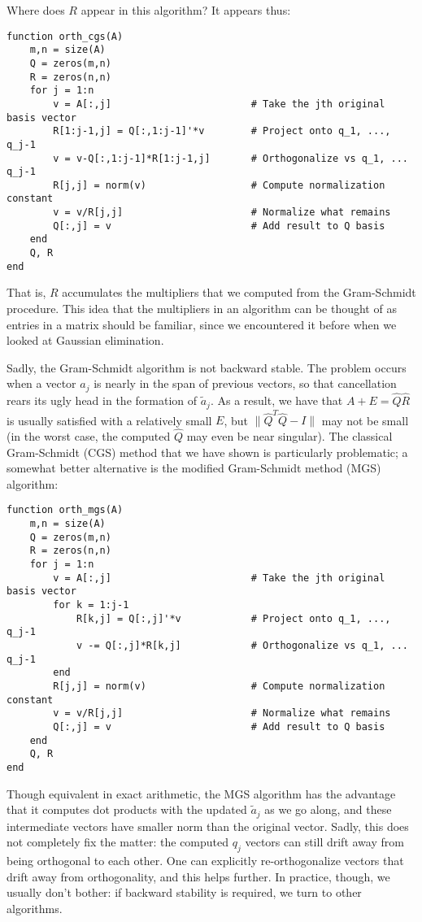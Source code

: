 \documentclass[12pt, leqno]{article} %
\begin{document}
Where does $R$ appear in this algorithm?  It appears thus:
\begin{lstlisting}
function orth_cgs(A)
    m,n = size(A)
    Q = zeros(m,n)
    R = zeros(n,n)
    for j = 1:n
        v = A[:,j]                        # Take the jth original basis vector
        R[1:j-1,j] = Q[:,1:j-1]'*v        # Project onto q_1, ..., q_j-1
        v = v-Q[:,1:j-1]*R[1:j-1,j]       # Orthogonalize vs q_1, ... q_j-1
        R[j,j] = norm(v)                  # Compute normalization constant
        v = v/R[j,j]                      # Normalize what remains
        Q[:,j] = v                        # Add result to Q basis
    end
    Q, R
end
\end{lstlisting}
That is, $R$ accumulates the multipliers that we computed from
the Gram-Schmidt procedure.  This idea that the multipliers
in an algorithm can be thought of as entries in a matrix should
be familiar, since we encountered it before when we looked at
Gaussian elimination.

Sadly, the Gram-Schmidt algorithm is not backward stable.
The problem occurs when a vector $a_j$ is nearly in the span of
previous vectors, so that cancellation rears its ugly head in the
formation of $\tilde{a}_j$.  As a result, we have that $A+E = \hat{Q} \hat{R}$ is
usually satisfied with a relatively small $E$, but
$\|\hat{Q}^T \hat{Q}-I\|$ may not be small (in the worst case, the computed
$\hat{Q}$ may even be near singular).
The classical Gram-Schmidt (CGS) method that we have shown is particularly
problematic; a somewhat better alternative is the modified Gram-Schmidt
method (MGS) algorithm:
\begin{lstlisting}
function orth_mgs(A)
    m,n = size(A)
    Q = zeros(m,n)
    R = zeros(n,n)
    for j = 1:n
        v = A[:,j]                        # Take the jth original basis vector
        for k = 1:j-1
            R[k,j] = Q[:,j]'*v            # Project onto q_1, ..., q_j-1
            v -= Q[:,j]*R[k,j]            # Orthogonalize vs q_1, ... q_j-1
        end
        R[j,j] = norm(v)                  # Compute normalization constant
        v = v/R[j,j]                      # Normalize what remains
        Q[:,j] = v                        # Add result to Q basis
    end
    Q, R
end
\end{lstlisting}
Though equivalent in exact arithmetic, the MGS algorithm has the advantage
that it computes dot products with the updated $\tilde{a}_j$ as we go
along, and these intermediate vectors have smaller norm than the original
vector.  Sadly, this does not completely fix the matter: the computed $q_j$
vectors can still drift away from being orthogonal to each other.  One can
explicitly re-orthogonalize vectors that drift away from orthogonality,
and this helps further.  In practice, though, we usually don't bother: if
backward stability is required, we turn to other algorithms.
\end{document}
